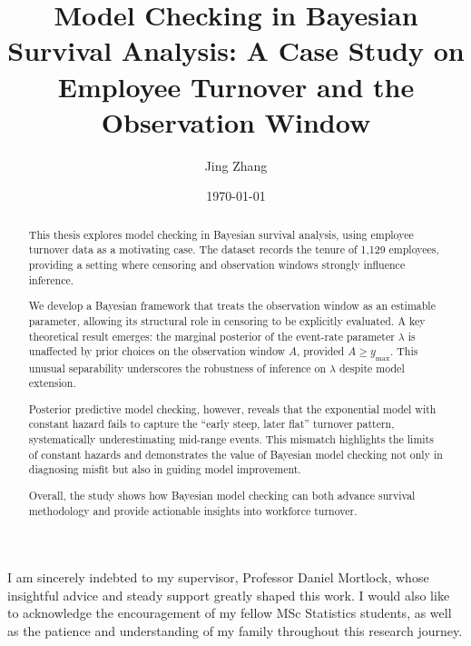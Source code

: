 \documentclass{statsmsc}
\title{Model Checking in Bayesian Survival Analysis: A Case Study on Employee Turnover and the Observation Window}
\author{Jing Zhang}
\date{\today}
\begin{document}
\maketitle

\declarationdate{\today}%
\declaration 


\begin{acknowledgements}
I am sincerely indebted to my supervisor, Professor Daniel Mortlock, whose insightful advice and steady support greatly shaped this work. I would also like to acknowledge the encouragement of my fellow MSc Statistics students, as well as the patience and understanding of my family throughout this research journey.
\end{acknowledgements}
\clearpage

\begin{abstract}
This thesis explores model checking in Bayesian survival analysis, using employee turnover data as a motivating case. The dataset records the tenure of 1,129 employees, providing a setting where censoring and observation windows strongly influence inference.

We develop a Bayesian framework that treats the observation window as an estimable parameter, allowing its structural role in censoring to be explicitly evaluated. A key theoretical result emerges: the marginal posterior of the event-rate parameter $\lambda$ is unaffected by prior choices on the observation window $A$, provided $A \geq y_{\max}$. This unusual separability underscores the robustness of inference on $\lambda$ despite model extension.

Posterior predictive model checking, however, reveals that the exponential model with constant hazard fails to capture the “early steep, later flat” turnover pattern, systematically underestimating mid-range events. This mismatch highlights the limits of constant hazards and demonstrates the value of Bayesian model checking not only in diagnosing misfit but also in guiding model improvement.

Overall, the study shows how Bayesian model checking can both advance survival methodology and provide actionable insights into workforce turnover.
\end{abstract}

\setcounter{tocdepth}{2} 
\tableofcontents
\clearpage
\end{document}
